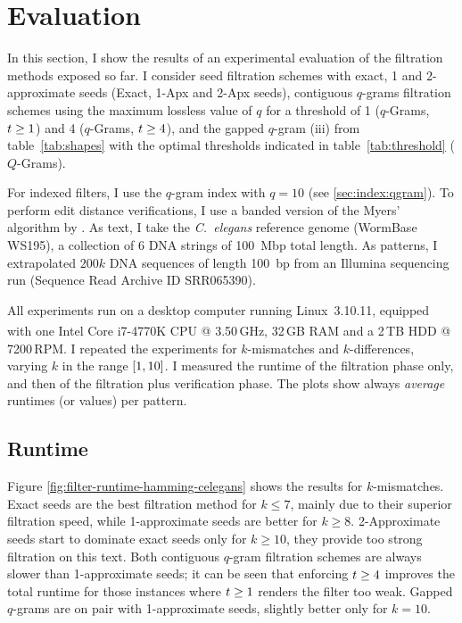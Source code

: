 
\section{Evaluation}
\label{sec:filtering:evaluation}

In this section, I show the results of an experimental evaluation of the filtration methods exposed so far.
I consider seed filtration schemes with exact, 1 and 2-approximate seeds (Exact, 1-Apx and 2-Apx seeds), contiguous $q$-grams filtration schemes using the maximum lossless value of $q$ for a threshold of 1 ($q$-Grams, $t \geq 1$) and 4 ($q$-Grams, $t \geq 4$), and the gapped $q$-gram (iii) from table~\ref{tab:shapes} with the optimal thresholds indicated in table~\ref{tab:threshold} ($Q$-Grams).

For indexed filters, I use the $q$-gram index with $q=10$ (see \ref{sec:index:qgram}).
To perform edit distance verifications, I use a banded version of the Myers' algorithm \citep{Myers1999} by \citep{Weese2012}.
As text, I take the \emph{C.~elegans} reference genome (WormBase WS195), \ie a collection of 6 DNA strings of 100~Mbp total length.
As patterns, I extrapolated $200k$ DNA sequences of length 100~bp from an Illumina sequencing run (Sequence Read Archive ID SRR065390).

All experiments run on a desktop computer running Linux~3.10.11, equipped with one Intel\textsuperscript{\textregistered} Core i7-4770K CPU @ 3.50\,GHz, 32\,GB RAM and a 2\,TB HDD @ 7200\,RPM.
I repeated the experiments for $k$-mismatches and $k$-differences, varying $k$ in the range $\left[1,10\right]$.
I measured the runtime of the filtration phase only, and then of the filtration plus verification phase.
The plots show always \emph{average} runtimes (or values) per pattern.

\subsection{Runtime}

Figure \ref{fig:filter-runtime-hamming-celegans} shows the results for $k$-mismatches.
Exact seeds are the best filtration method for $k \leq 7$, mainly due to their superior filtration speed, while 1-approximate seeds are better for $k \geq 8$.
2-Approximate seeds start to dominate exact seeds only for $k \geq 10$, \ie they provide too strong filtration on this text.
Both contiguous $q$-gram filtration schemes are always slower than 1-approximate seeds;
it can be seen that enforcing $t \geq 4$ improves the total runtime for those instances where $t \geq 1$ renders the filter too weak.
Gapped $q$-grams are on pair with 1-approximate seeds, slightly better only for $k = 10$.

